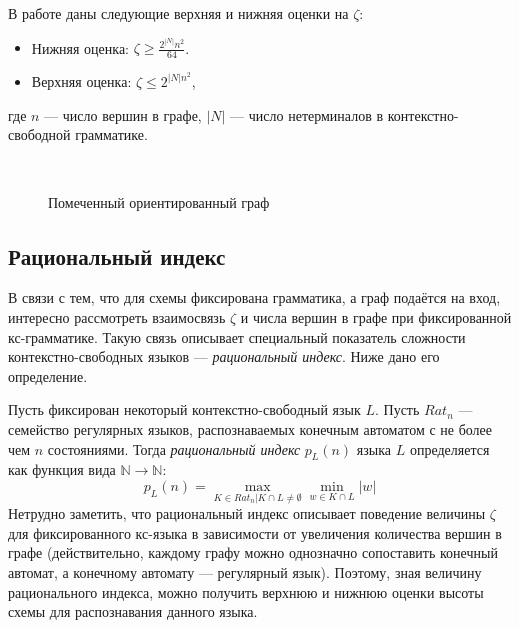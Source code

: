 В работе \cite{HellingsCFPQ} даны следующие верхняя и нижняя оценки на $\zeta$:
\begin{itemize}
\item Нижняя оценка:  $\zeta \ge \frac{2^{|N|}n^2}{64} $.
\item Верхняя оценка: $\zeta \le 2^{|N|n^2}$,
\end{itemize}
где $n$ --- число вершин в графе, $|N|$ --- число нетерминалов в контекстно-свободной грамматике.
\begin{figure}
\centering

\\
	\caption{Помеченный ориентированный граф}
\label{graph}
\end{figure}
\subsection{Рациональный индекс}
В связи с тем, что для схемы фиксирована грамматика, а граф подаётся на вход, интересно рассмотреть взаимосвязь $\zeta$ и числа вершин в графе при фиксированной кс-грамматике.
Такую связь описывает специальный показатель сложности контекстно-свободных языков --- \textit{рациональный индекс}. Ниже дано его определение.

Пусть фиксирован некоторый контекстно-свободный язык $L$. Пусть $Rat_n$ --- семейство регулярных языков, распознаваемых конечным автоматом с  не более чем $n$ состояниями.  Тогда \textit{рациональный индекс} $p_L(n)$ языка $L$ определяется как функция вида $\mathbb{N} \rightarrow \mathbb{N}$:
\begin{equation}
p_L(n) = \max\limits_{K \in Rat_n | K  \cap L \neq \emptyset} \min\limits_{w \in K  \cap L } |w|
\end{equation}
Нетрудно заметить, что рациональный индекс описывает поведение величины  $\zeta$ для фиксированного кс-языка в зависимости от увеличения количества вершин в графе (действительно, каждому графу можно однозначно сопоставить конечный автомат, а конечному автомату --- регулярный язык).  Поэтому, зная величину рационального индекса, можно получить верхнюю и нижнюю оценки высоты схемы для распознавания данного языка.

